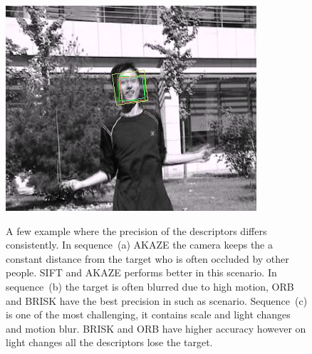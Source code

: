 \begin{figure}[!htb]
{{	           \includegraphics[width=0.24\linewidth,trim={0, 0 0 2cm},clip]{imgs/comparison/blur4.png}}
	           \label{fig:jumping}}
	           \centerline{%
	           \label{fig:skating}}
\caption{A few example where the precision of the descriptors differs consistently. In sequence~(a) AKAZE the camera keeps the a constant distance from the target who is often occluded by other people. SIFT and AKAZE performs better in this scenario. In sequence~(b) the target is often blurred due to high motion, ORB and BRISK have the best precision in such as scenario. Sequence~(c) is one of the most challenging, it contains scale and light changes and motion blur. BRISK and ORB have higher accuracy however on light changes all the descriptors lose the target.}
\vspace{-3mm}
\label{fig:tracking_comparison}
\end{figure}





